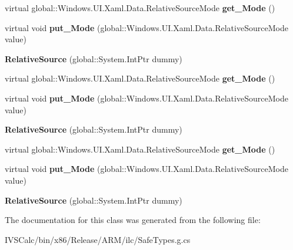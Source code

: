 \begin{DoxyCompactItemize}
virtual global\+::\+Windows.\+U\+I.\+Xaml.\+Data.\+Relative\+Source\+Mode {\bfseries get\+\_\+\+Mode} ()
\item 
\mbox{\label{class_windows_1_1_u_i_1_1_xaml_1_1_data_1_1_relative_source_a83c13d6ab8d1870d38248711c1c204e3}} 
virtual void {\bfseries put\+\_\+\+Mode} (global\+::\+Windows.\+U\+I.\+Xaml.\+Data.\+Relative\+Source\+Mode value)
\item 
\mbox{\label{class_windows_1_1_u_i_1_1_xaml_1_1_data_1_1_relative_source_a69d6d4e509b7729188061fa485d9bbbe}} 
{\bfseries Relative\+Source} (global\+::\+System.\+Int\+Ptr dummy)
\item 
\mbox{\label{class_windows_1_1_u_i_1_1_xaml_1_1_data_1_1_relative_source_abc7acda53d33c1b4b39153909fa1e745}} 
virtual global\+::\+Windows.\+U\+I.\+Xaml.\+Data.\+Relative\+Source\+Mode {\bfseries get\+\_\+\+Mode} ()
\item 
\mbox{\label{class_windows_1_1_u_i_1_1_xaml_1_1_data_1_1_relative_source_a83c13d6ab8d1870d38248711c1c204e3}} 
virtual void {\bfseries put\+\_\+\+Mode} (global\+::\+Windows.\+U\+I.\+Xaml.\+Data.\+Relative\+Source\+Mode value)
\item 
\mbox{\label{class_windows_1_1_u_i_1_1_xaml_1_1_data_1_1_relative_source_a69d6d4e509b7729188061fa485d9bbbe}} 
{\bfseries Relative\+Source} (global\+::\+System.\+Int\+Ptr dummy)
\item 
\mbox{\label{class_windows_1_1_u_i_1_1_xaml_1_1_data_1_1_relative_source_abc7acda53d33c1b4b39153909fa1e745}} 
virtual global\+::\+Windows.\+U\+I.\+Xaml.\+Data.\+Relative\+Source\+Mode {\bfseries get\+\_\+\+Mode} ()
\item 
\mbox{\label{class_windows_1_1_u_i_1_1_xaml_1_1_data_1_1_relative_source_a83c13d6ab8d1870d38248711c1c204e3}} 
virtual void {\bfseries put\+\_\+\+Mode} (global\+::\+Windows.\+U\+I.\+Xaml.\+Data.\+Relative\+Source\+Mode value)
\item 
\mbox{\label{class_windows_1_1_u_i_1_1_xaml_1_1_data_1_1_relative_source_a69d6d4e509b7729188061fa485d9bbbe}} 
{\bfseries Relative\+Source} (global\+::\+System.\+Int\+Ptr dummy)
\end{DoxyCompactItemize}


The documentation for this class was generated from the following file\+:\begin{DoxyCompactItemize}
\item 
I\+V\+S\+Calc/bin/x86/\+Release/\+A\+R\+M/ilc/Safe\+Types.\+g.\+cs\end{DoxyCompactItemize}
